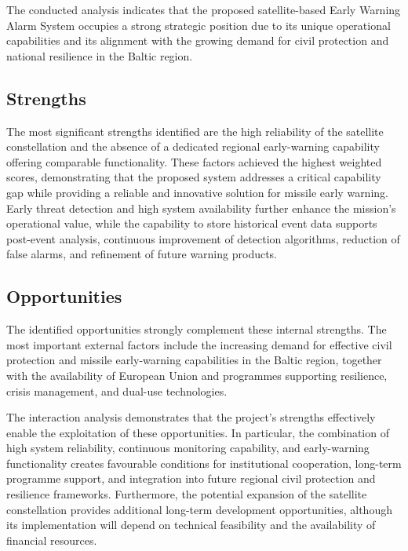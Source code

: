 The conducted  analysis indicates that the proposed satellite-based Early Warning Alarm System occupies a strong strategic position due to its unique operational capabilities and its alignment with the growing demand for civil protection and national resilience in the Baltic region.

\subsection{Strengths}

The most significant strengths identified are the high reliability of the satellite constellation and the absence of a dedicated regional early-warning capability offering comparable functionality. These factors achieved the highest weighted scores, demonstrating that the proposed system addresses a critical capability gap while providing a reliable and innovative solution for missile early warning. Early threat detection and high system availability further enhance the mission's operational value, while the capability to store historical event data supports post-event analysis, continuous improvement of detection algorithms, reduction of false alarms, and refinement of future warning products.

\subsection{Opportunities}

The identified opportunities strongly complement these internal strengths. The most important external factors include the increasing demand for effective civil protection and missile early-warning capabilities in the Baltic region, together with the availability of European Union and  programmes supporting resilience, crisis management, and dual-use technologies.

The interaction analysis demonstrates that the project's strengths effectively enable the exploitation of these opportunities. In particular, the combination of high system reliability, continuous monitoring capability, and early-warning functionality creates favourable conditions for institutional cooperation, long-term programme support, and integration into future regional civil protection and resilience frameworks. Furthermore, the potential expansion of the satellite constellation provides additional long-term development opportunities, although its implementation will depend on technical feasibility and the availability of financial resources.

